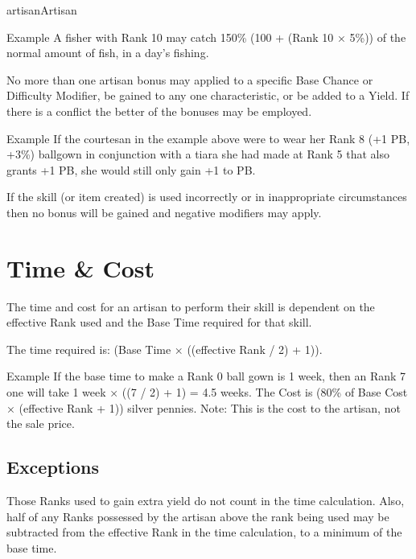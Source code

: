 \begin{Skill}[2.0]{artisan}{Artisan}
\begin{Description}
\item[Example ]A fisher with Rank 10 may catch 150\% (100 + (Rank 10 ×
  5\%)) of the normal amount of fish, in a day’s fishing.

\end{Description}

No more than one artisan bonus may applied to a specific Base Chance
or Difficulty Modifier, be gained to any one characteristic, or be
added to a Yield. If there is a conflict the better of the bonuses may
be employed.

\begin{Description}

\item[Example] If the courtesan in the example above were to wear her
  Rank 8 (+1 PB, +3\%) ballgown in conjunction with a tiara she had
  made at Rank 5 that also grants +1 PB, she would still only gain +1
  to PB.

\end{Description}

If the skill (or item created) is used incorrectly or in inappropriate
circumstances then no bonus will be gained and negative modifiers may
apply.

\section{Time \& Cost}

The time and cost for an artisan to perform their skill is dependent
on the effective Rank used and the Base Time required for that skill.

The time required is: (Base Time × ((effective Rank / 2) + 1)).

\begin{Description}
\item[Example] If the base time to make a Rank 0 ball gown is 1 week,
  then an Rank 7 one will take 1 week × ((7 / 2) + 1) = 4.5 weeks.
  The Cost is (80\% of Base Cost × (effective Rank + 1)) silver
  pennies. Note: This is the cost to the artisan, not the sale price.
\end{Description}

\subsection{Exceptions}

Those Ranks used to gain extra yield do not count in the time
calculation.  Also, half of any Ranks possessed by the artisan above
the rank being used may be subtracted from the effective Rank in the
time calculation, to a minimum of the base time.


\end{Skill}
